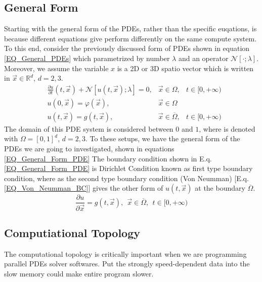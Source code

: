 \subsection{General Form}
Starting with the general form of the PDEs, rather than the specific euqations, is because 
different equations give perform differently on the same compute system.
To this end, consider the previously discussed form of PDEs shown in 
equation \ref{EQ_General_PDEs} which parametrized by number $\lambda$ and an operator $\mathcal{N}[\cdot; \lambda]$.
Moreover, we assume the variable $x$ is a 2D or 3D spatio vector which is written in 
$\vec{x} \in \mathbb{R}^d$, $d = 2, 3$.
\begin{align}\label{EQ_General_Form_PDE}
  &\frac{\partial u}{\partial t}\left(t,\vec{x}\right) + \mathcal{N}\left[u(t,\vec{x});\lambda\right] = 0, &\vec{x}\in\Omega, &t\in[0, +\infty) \nonumber\\
  &u\left(0,\vec{x}\right) = \varphi (\vec{x}), &\vec{x}\in\Omega & \\
  &u\left(t,\vec{x}\right) = g (t,\vec{x}),     &\vec{x}\in \overline{\Omega}, &t\in[0, +\infty) \nonumber
\end{align}
The domain of this PDE system is considered between $0$ and $1$, where is denoted with $\Omega = [0, 1]^d$, $d = 2,3$.
To these setups, we have the general form of the PDEs we are going to investigated, shown in equations \ref{EQ_General_Form_PDE}
The boundary condition shown in E.q. \ref{EQ_General_Form_PDE} is Dirichlet Condition known as first type boundary condition, where as the 
second type boundary condition (Von Neumman) [E.q. \ref{EQ_Von_Neumman_BC}] gives the other form of $u(t,\vec{x})$ at the boundary $\overline{\Omega}$.
\begin{equation}\label{EQ_Von_Neumman_BC}
  \frac{\partial u}{\partial \vec{x}} = g(t, \vec{x}),\:\: \vec{x}\in \overline{\Omega}, \:\:t\in[0, +\infty)
\end{equation}


\subsection{Computiational Topology}
The computational topology is critically important when we are programming parallel PDEs solver softwares.
Put the strongly speed-dependent data into the slow memory could make entire program slower.


